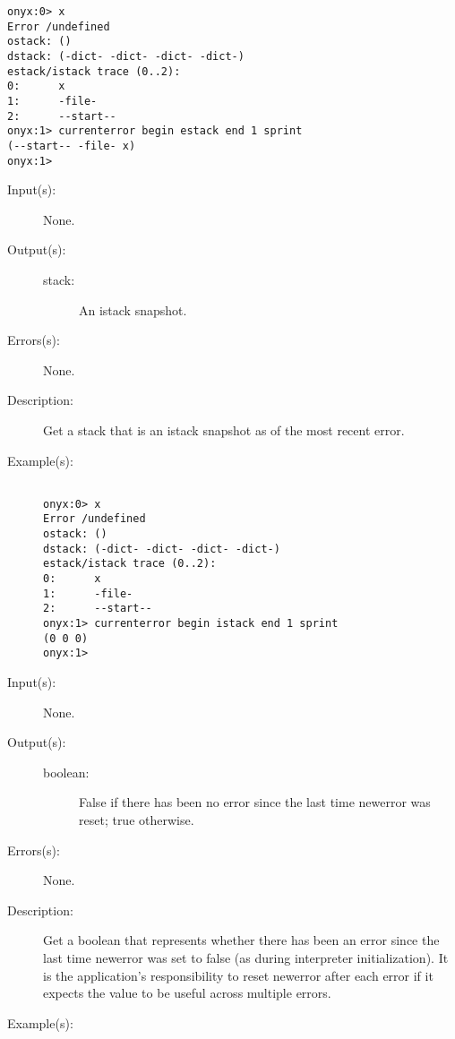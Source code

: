 \begin{description}
\begin{description}
\begin{verbatim}
onyx:0> x
Error /undefined
ostack: ()
dstack: (-dict- -dict- -dict- -dict-)
estack/istack trace (0..2):
0:      x
1:      -file-
2:      --start--
onyx:1> currenterror begin estack end 1 sprint
(--start-- -file- x)
onyx:1>
		\end{verbatim}
	\end{description}
\label{currenterror:istack}
\item[{\onyxop{--}{istack}{stack}}: ]
	\begin{description}\item[]
	\item[Input(s): ] None.
	\item[Output(s): ]
		\begin{description}\item[]
		\item[stack: ]
			An istack snapshot.
		\end{description}
	\item[Errors(s): ] None.
	\item[Description: ]
		Get a stack that is an istack snapshot as of the most recent
		error.
	\item[Example(s): ]\begin{verbatim}

onyx:0> x
Error /undefined
ostack: ()
dstack: (-dict- -dict- -dict- -dict-)
estack/istack trace (0..2):
0:      x
1:      -file-
2:      --start--
onyx:1> currenterror begin istack end 1 sprint
(0 0 0)
onyx:1>
		\end{verbatim}
	\end{description}
\label{currenterror:newerror}
\item[{\onyxop{--}{newerror}{boolean}}: ]
	\begin{description}\item[]
	\item[Input(s): ] None.
	\item[Output(s): ]
		\begin{description}\item[]
		\item[boolean: ]
			False if there has been no error since the last time
			newerror was reset; true otherwise.
		\end{description}
	\item[Errors(s): ] None.
	\item[Description: ]
		Get a boolean that represents whether there has been an error
		since the last time newerror was set to false (as during
		interpreter initialization).  It is the application's
		responsibility to reset newerror after each error if it expects
		the value to be useful across multiple errors.
	\item[Example(s): ]\begin{verbatim}


\end{verbatim}
\end{description}
\end{description}
